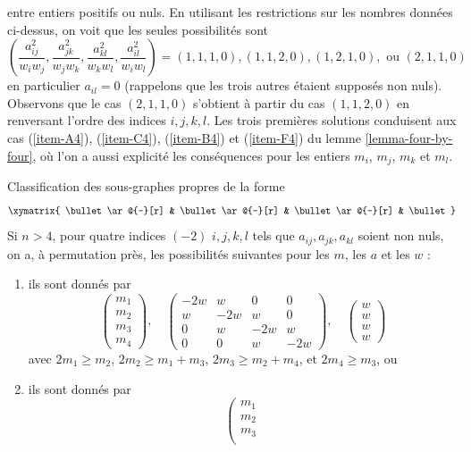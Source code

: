 entre entiers positifs ou nuls. En utilisant les restrictions sur les nombres données ci-dessus,
on voit que les seules possibilités sont
$$
(\frac{a_{ij}^2}{w_iw_j}, \frac{a_{jk}^2}{w_jw_k}, \frac{a_{kl}^2}{w_kw_l},
\frac{a_{il}^2}{w_iw_l}) =
(1, 1, 1, 0), (1, 1, 2, 0), (1, 2, 1, 0), \text{ ou }(2, 1, 1, 0)
$$
en particulier $a_{il} = 0$ (rappelons que les trois autres étaient supposés
non nuls). Observons que le cas $(2, 1, 1, 0)$ s'obtient
à partir du cas $(1, 1, 2, 0)$ en renversant l'ordre
des indices $i, j, k, l$. Les trois premières solutions conduisent
aux cas (\ref{item-A4}), (\ref{item-C4}), (\ref{item-B4}) et
(\ref{item-F4}) du lemme \ref{lemma-four-by-four},
où l'on a aussi explicité les conséquences pour les entiers $m_i$, $m_j$, $m_k$
et $m_l$.

\begin{lemma}
\label{lemma-four-by-four}
Classification des sous-graphes propres de la forme
$$
\xymatrix{
\bullet \ar@{-}[r] &
\bullet \ar@{-}[r] &
\bullet \ar@{-}[r] &
\bullet
}
$$
Si $n > 4$, pour quatre indices $(-2)$ $i, j, k, l$
tels que $a_{ij}, a_{jk}, a_{kl}$ soient non nuls, on a,
à permutation près, les possibilités suivantes pour les $m$, les $a$ et les $w$ :
\begin{enumerate}
\item
\label{item-A4}
ils sont donnés par
$$
\left(
\begin{matrix}
m_1 \\
m_2 \\
m_3 \\
m_4
\end{matrix}
\right),
\quad
\left(
\begin{matrix}
-2w & w & 0 & 0 \\
w & -2w & w & 0 \\
0 & w & -2w & w \\
0 & 0 & w & -2w 
\end{matrix}
\right),
\quad
\left(
\begin{matrix}
w \\
w \\
w \\
w
\end{matrix}
\right)
$$
avec $2m_1 \geq m_2$, $2m_2 \geq m_1 + m_3$, $2m_3 \geq m_2 + m_4$,
et $2m_4 \geq m_3$, ou
\item
\label{item-C4}
ils sont donnés par
$$
\left(
\begin{matrix}
m_1 \\
m_2 \\
m_3 \\

\end{matrix}$$
\end{enumerate}
\end{lemma}
